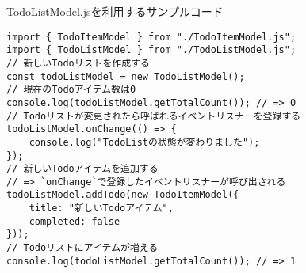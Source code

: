 \begin{listtitle}
TodoListModel.jsを利用するサンプルコード
\end{listtitle}
\begin{lstlisting}
import { TodoItemModel } from "./TodoItemModel.js";
import { TodoListModel } from "./TodoListModel.js";
// 新しいTodoリストを作成する
const todoListModel = new TodoListModel();
// 現在のTodoアイテム数は0
console.log(todoListModel.getTotalCount()); // => 0
// Todoリストが変更されたら呼ばれるイベントリスナーを登録する
todoListModel.onChange(() => {
    console.log("TodoListの状態が変わりました");
});
// 新しいTodoアイテムを追加する
// => `onChange`で登録したイベントリスナーが呼び出される
todoListModel.addTodo(new TodoItemModel({
    title: "新しいTodoアイテム",
    completed: false
}));
// Todoリストにアイテムが増える
console.log(todoListModel.getTotalCount()); // => 1
\end{lstlisting}
\listend
